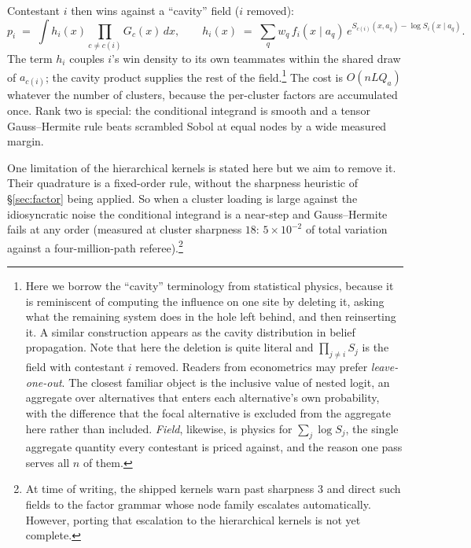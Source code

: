 \documentclass[11pt]{article}
\begin{document}
Contestant $i$ then wins against a ``cavity'' field ($i$ removed):
\begin{equation}\label{eq:cavity}
p_i \;=\; \int h_i(x)\prod_{c\ne c(i)}G_c(x)\,dx,
\qquad
h_i(x) \;=\; \sum_q w_q\, f_i(x\mid a_q)\,e^{S_{c(i)}(x,a_q)-\log S_i(x\mid a_q)}.
\end{equation}
The term $h_i$ couples $i$'s win density to its own teammates within the shared
draw of $a_{c(i)}$; the cavity product supplies the rest of the field.\footnote{Here we borrow the ``cavity'' terminology from statistical physics, because it is reminiscent of computing the influence on one site by deleting it,
asking what the remaining system does in the hole left behind, and then
reinserting it. A similar construction appears as the cavity distribution
in belief propagation. Note that here the deletion is quite literal and $\prod_{j\ne i}S_j$
is the field with contestant $i$ removed. Readers from econometrics may
prefer \emph{leave-one-out}. The closest familiar object is the inclusive
value of nested logit, an aggregate over alternatives that enters each
alternative's own probability, with the difference that the focal
alternative is excluded from the aggregate here rather than included.
\emph{Field}, likewise, is physics for $\sum_j\log S_j$, the single
aggregate quantity every contestant is priced against, and the reason one
pass serves all $n$ of them.}
The cost
is $O(nLQ_a)$ whatever the number of clusters, because the per-cluster factors
are accumulated once. Rank two is special: the conditional integrand is smooth
and a tensor Gauss--Hermite rule beats scrambled Sobol at equal nodes by a wide
measured margin.

One limitation of the hierarchical kernels is stated here but we aim to remove it.
Their quadrature is a fixed-order rule, without
the sharpness heuristic of \S\ref{sec:factor} being applied. So when a cluster loading
is large against the idiosyncratic noise the conditional integrand is a
near-step and Gauss--Hermite fails at any order (measured at cluster
sharpness $18$: $5\times10^{-2}$ of total variation against a
four-million-path referee).\footnote{At time of writing, the shipped kernels warn past sharpness $3$ and
direct such fields to the factor grammar whose node family escalates
automatically. However, porting that escalation to the hierarchical kernels is not yet complete.}
\end{document}
